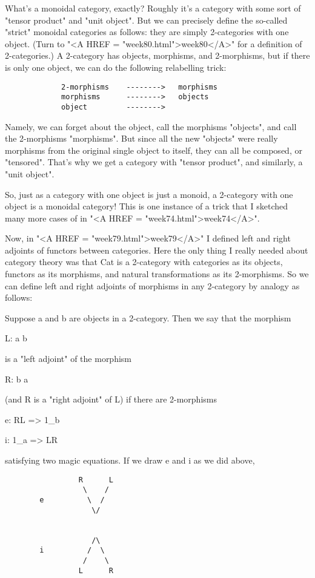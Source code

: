What's a monoidal category, exactly?  Roughly it's a category with some
sort of "tensor product" and "unit object".  But we can precisely define
the so-called "strict" monoidal categories as follows: they are simply
2-categories with one object.  (Turn to "<A HREF = "week80.html">week80</A>" for a definition of
2-categories.)   A 2-category has objects, morphisms, and 2-morphisms,
but if there is only one object, we can do the following relabelling
trick: 

\begin{verbatim}
             2-morphisms    -------->   morphisms
             morphisms      -------->   objects
             object         -------->   
\end{verbatim}
    

Namely, we can forget about the object, call the morphisms
"objects", and call the 2-morphisms "morphisms".
But since all the new "objects" were really morphisms from the
original single object to itself, they can all be composed, or
"tensored".  That's why we get a category with "tensor
product", and similarly, a "unit object".

So, just as a category with one object is just a monoid, a 2-category
with one object is a monoidal category!  This is one instance of a trick
that I sketched many more cases of in "<A HREF = "week74.html">week74</A>".

Now, in "<A HREF = "week79.html">week79</A>" I defined left and right adjoints of functors between
categories.  Here the only thing I really needed about category
theory was that Cat is a 2-category with categories as its objects,
functors as its morphisms, and natural transformations as its
2-morphisms.  So we can define left and right adjoints of morphisms in
any 2-category by analogy as follows:

Suppose a and b are objects in a 2-category.  Then we say that the morphism

L: a \to  b

is a "left adjoint" of the morphism

R: b \to  a

(and R is a "right adjoint" of L) if there are 2-morphisms

e: RL => 1_{b}

i: 1_{a} => LR

satisfying two magic equations.  If we draw e and i as we did above, 

\begin{verbatim}
                 R      L
                  \    /
        e          \  / 
                    \/


                    /\
        i          /  \
                  /    \
                 L      R

\end{verbatim}
    
